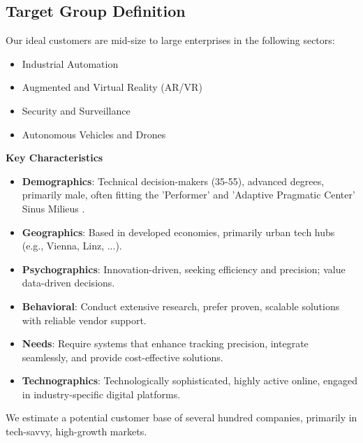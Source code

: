 \subsection{Target Group Definition}

Our ideal customers are mid-size to large enterprises in the following sectors:

\begin{itemize}
	\item Industrial Automation
	\item Augmented and Virtual Reality (AR/VR)
	\item Security and Surveillance
	\item Autonomous Vehicles and Drones
\end{itemize}

\textbf{Key Characteristics}

\begin{itemize}
	\item \textbf{Demographics}: Technical decision-makers (35-55), advanced degrees, primarily male, often fitting the 'Performer' and 'Adaptive Pragmatic Center' Sinus Milieus \cite{sinus_institut_2024}.
	\item \textbf{Geographics}: Based in developed economies, primarily urban tech hubs (e.g., Vienna, Linz, ...).
	\item \textbf{Psychographics}: Innovation-driven, seeking efficiency and precision; value data-driven decisions.
	\item \textbf{Behavioral}: Conduct extensive research, prefer proven, scalable solutions with reliable vendor support.
	\item \textbf{Needs}: Require systems that enhance tracking precision, integrate seamlessly, and provide cost-effective solutions.
	\item \textbf{Technographics}: Technologically sophisticated, highly active online, engaged in industry-specific digital platforms.
\end{itemize}

We estimate a potential customer base of several hundred companies, primarily in tech-savvy, high-growth markets.